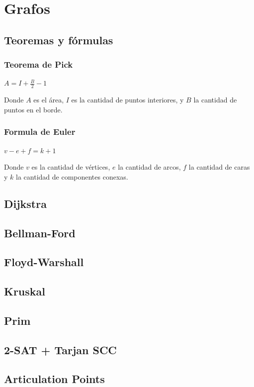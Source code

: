 \section{Grafos}%
\subsection{Teoremas y fórmulas}
{
\subsubsection{Teorema de Pick}
{
$A=I+\frac{B}{2}-1$

Donde \(A\) es el área, \(I\) es la cantidad de puntos interiores, y \(B\) la cantidad de puntos en el borde.
}

\subsubsection{Formula de Euler}
{
$v-e+f=k+1$

Donde \(v\) es la cantidad de vértices, \(e\) la cantidad de arcos, \(f\) la cantidad de caras y \(k\) la cantidad de componentes conexas.
}
}
\subsection{Dijkstra}
\subsection{Bellman-Ford}
\subsection{Floyd-Warshall}
\subsection{Kruskal}
\subsection{Prim}
\subsection{2-SAT + Tarjan SCC}
\subsection{Articulation Points}
